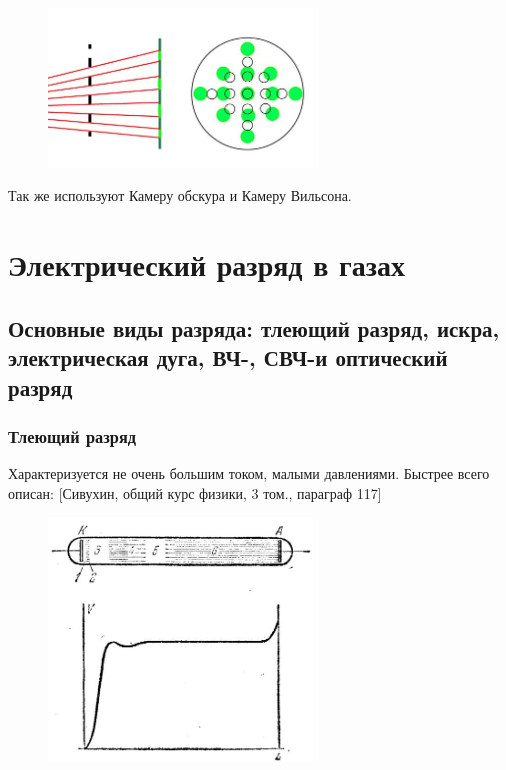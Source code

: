 \documentclass[10pt, a4paper]{article}
\let\stdsection\section
\renewcommand\section{\newpage\stdsection}
\begin{document}
\begin{figure}[ht]
	\begin{center}
		\includegraphics[width=70mm]{scintelator.JPG}
	\end{center}
\end{figure}

Так же используют Камеру обскура и Камеру Вильсона.

\section{Электрический разряд в газах}

\subsection{Основные виды разряда: тлеющий разряд, искра, электрическая дуга, ВЧ-, СВЧ-и оптический разряд}
\subsubsection{Тлеющий разряд}
Характеризуется не очень большим током, малыми давлениями.
Быстрее всего описан: [Сивухин, общий курс физики, 3 том., параграф 117]

\begin{figure}[ht]
	\begin{center}
		\includegraphics[width=70mm]{12.1.JPG}
	\end{center}
\end{figure}
\end{document}
